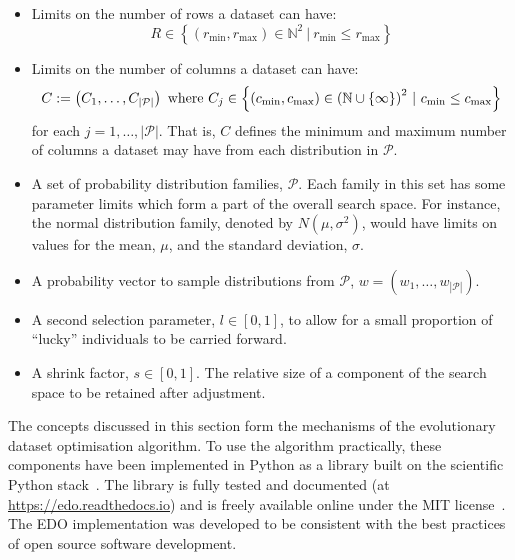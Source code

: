 \begin{itemize}
    \item Limits on the number of rows a dataset can have:
        \[
            R \in \left\{%
                (r_{\min}, r_{\max}) \in \mathbb{N}^2~|~r_{\min} \leq r_{\max}
            \right\}
        \]
    \item Limits on the number of columns a dataset can have:
        \[
            C := \left(C_1, \ldots, C_{|\mathcal{P}|}\right)
            ~\text{where}~
            C_j \in \left\{ (c_{\min}, c_{\max}) \in {%
                \left(\mathbb{N}\cup\{\infty\}\right)
            }^2~|~c_{\min} \leq c_{\max}\right\}
        \]
        for each \(j = 1, \ldots, |\mathcal{P}|\). That is, \(C\) defines the
        minimum and maximum number of columns a dataset may have from each
        distribution in \(\mathcal{P}\).
    \item A set of probability distribution families, \(\mathcal{P}\). Each
        family in this set has some parameter limits which form a part of the
        overall search space. For instance, the normal distribution family,
        denoted by \(N(\mu, \sigma^2)\), would have limits on values for the
        mean, \(\mu\), and the standard deviation, \(\sigma\).
    \item A probability vector to sample distributions from \(\mathcal{P}\),
        \(w = \left(w_1, \ldots, w_{|\mathcal{P}|}\right)\).
    \item A second selection parameter, \(l \in [0, 1]\), to allow for a
        small proportion of ``lucky'' individuals to be carried forward.
    \item A shrink factor, \(s \in [0, 1]\). The relative size of a component of
        the search space to be retained after adjustment.
\end{itemize}

The concepts discussed in this section form the mechanisms of the evolutionary
dataset optimisation algorithm. To use the algorithm practically, these
components have been implemented in Python as a library built on the scientific
Python stack~\cite{pandas,numpy}. The library is fully tested and documented (at
\url{https://edo.readthedocs.io}) and is freely available online under the MIT
license~\cite{edo-project}. The EDO implementation was developed to be
consistent with the best practices of open source software development.

\label{alg:edo}


